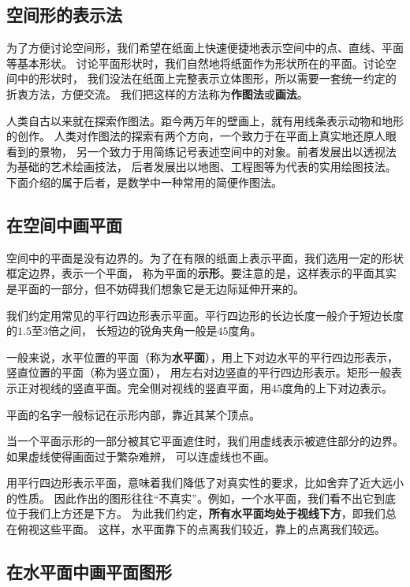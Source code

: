 \documentclass[12pt,UTF8,fontset=none]{ctexbook}
\begin{document}
\begin{appendix}

\chapter{空间形的表示法}

为了方便讨论空间形，我们希望在纸面上快速便捷地表示空间中的点、直线、平面等基本形状。
讨论平面形状时，我们自然地将纸面作为形状所在的平面。讨论空间中的形状时，
我们没法在纸面上完整表示立体图形，所以需要一套统一约定的折衷方法，方便交流。
我们把这样的方法称为\textbf{作图法}或\textbf{画法}。

人类自古以来就在探索作图法。距今两万年的壁画上，就有用线条表示动物和地形的创作。
人类对作图法的探索有两个方向，一个致力于在平面上真实地还原人眼看到的景物，
另一个致力于用简练记号表述空间中的对象。前者发展出以透视法为基础的艺术绘画技法，
后者发展出以地图、工程图等为代表的实用绘图技法。
下面介绍的属于后者，是数学中一种常用的简便作图法。

\section{在空间中画平面}

空间中的平面是没有边界的。为了在有限的纸面上表示平面，我们选用一定的形状框定边界，表示一个平面，
称为平面的\textbf{示形}。要注意的是，这样表示的平面其实是平面的一部分，但不妨碍我们想象它是无边际延伸开来的。

我们约定用常见的平行四边形表示平面。平行四边形的长边长度一般介于短边长度的$1.5$至$3$倍之间，
长短边的锐角夹角一般是$45$度角。

一般来说，水平位置的平面（称为\textbf{水平面}），用上下对边水平的平行四边形表示，竖直位置的平面（称为竖立面），
用左右对边竖直的平行四边形表示。矩形一般表示正对视线的竖直平面。完全侧对视线的竖直平面，用$45$度角的上下对边表示。

平面的名字一般标记在示形内部，靠近其某个顶点。

当一个平面示形的一部分被其它平面遮住时，我们用虚线表示被遮住部分的边界。如果虚线使得画面过于繁杂难辨，
可以连虚线也不画。

用平行四边形表示平面，意味着我们降低了对真实性的要求，比如舍弃了近大远小的性质。
因此作出的图形往往“不真实”。例如，一个水平面，我们看不出它到底位于我们上方还是下方。
为此我们约定，\textbf{所有水平面均处于视线下方}，即我们总在俯视这些平面。
这样，水平面靠下的点离我们较近，靠上的点离我们较远。

\section{在水平面中画平面图形}


\end{appendix}
\end{document}
